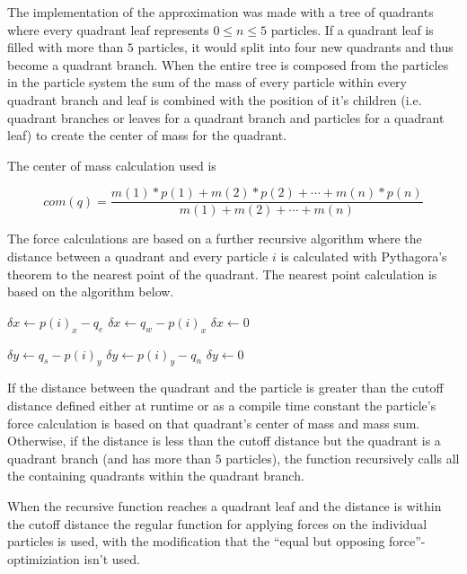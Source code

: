 \documentclass[titlepage,a4paper,12pt]{article}
\begin{document}
The implementation of the approximation was made with a tree of quadrants where
every quadrant leaf represents $0 \le n \le 5$ particles. If a quadrant leaf
is filled with more than $5$ particles, it would split into four new quadrants
and thus become a quadrant branch. When the entire tree is composed from the
particles in the particle system the sum of the mass of every particle within
every quadrant branch and leaf is combined with the position of it's children
(i.e. quadrant branches or leaves for a quadrant branch and particles for
a quadrant leaf) to create the center of mass for the quadrant.

The center of mass calculation used is

\begin{equation}
com(q) = \dfrac{m(1)*p(1) + m(2)*p(2) + \cdots + m(n)*p(n)}{m(1) + m(2) + \cdots + m(n)}
\end{equation}

The force calculations are based on a further recursive algorithm where the
distance between a quadrant and every particle $i$ is calculated with 
Pythagora's theorem to the nearest point of the quadrant. The nearest point
calculation is based on the algorithm below.

\begin{algorithmic}
  \State $\delta x \gets p(i)_x - q_e$
  \State $\delta x \gets q_w - p(i)_x$
\Else
  \State $\delta x \gets 0$
\EndIf

  \State $\delta y \gets q_s - p(i)_y$
  \State $\delta y \gets p(i)_y - q_n$
\Else
  \State $\delta y \gets 0$
\EndIf
\end{algorithmic}

If the distance between the quadrant and the particle is greater than the
cutoff distance defined either at runtime or as a compile time constant
the particle's force calculation is based on that quadrant's center of mass
and mass sum. Otherwise, if the distance is less than the cutoff distance but
the quadrant is a quadrant branch (and has more than $5$ particles), the
function recursively calls all the containing quadrants within the quadrant
branch.

When the recursive function reaches a quadrant leaf and the distance is within
the cutoff distance the regular function for applying forces on the individual
particles is used, with the modification that the ``equal but opposing force''-
optimiziation isn't used.
\end{document}
